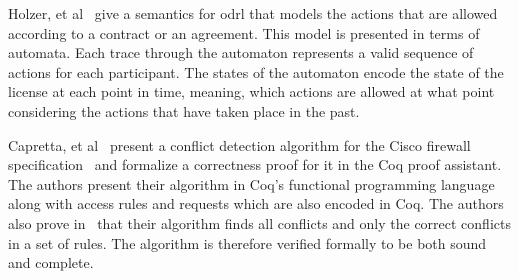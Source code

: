 \documentclass[runningheads,a4paper]{llncs}
\begin{document}
%

Holzer, et al~\cite{Holzer} give a semantics for \ac{odrl} that models the actions that are allowed according to a contract or an agreement. This model is presented in terms of automata. Each trace through the automaton represents a valid sequence of actions for each participant. The states of the automaton encode the state of the license at each point in time, meaning, which actions are allowed at what point considering the actions that have taken place in the past. 


Capretta, et al~\cite{CaprettaSFM07} present a conflict detection algorithm for the Cisco firewall specification~\cite{ciscofirewall} and formalize a correctness proof for it in the Coq proof assistant. The authors present their algorithm in Coq's functional programming language along with access rules and requests which are also encoded in Coq. The authors also prove in~\cite{CaprettaSFM07} that their algorithm finds all conflicts and only the correct conflicts in a set of rules. The algorithm is therefore verified formally to be both sound and complete.
\end{document}
